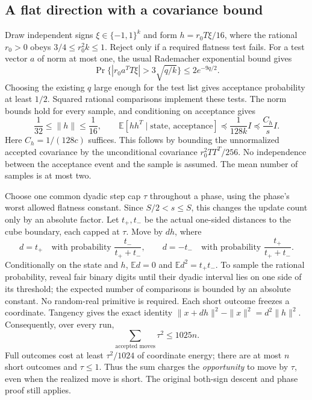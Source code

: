 \documentclass[11pt]{amsart}
\theoremstyle{remark}\newtheorem{remark}[theorem]{Remark}
\begin{document}
\subsection{A flat direction with a covariance bound}
Draw independent signs $\xi\in\{-1,1\}^k$ and form
$h=r_0T\xi/16$, where the rational $r_0>0$ obeys
$3/4\le r_0^2k\le1$. Reject only if a required flatness test fails.
For a test vector $a$ of norm at most one, the usual Rademacher
exponential bound gives
\[
 \Pr\{|r_0a^TT\xi|>3\sqrt{q/k}\}\le 2e^{-9q/2}.
\]
Choosing the existing $q$ large enough for the test list gives acceptance
probability at least $1/2$. Squared rational comparisons implement these
tests. The norm bounds hold for every sample, and conditioning on
acceptance gives
\begin{equation}\label{eq:randomcov}
 \frac1{32}\le\|h\|\le\frac1{16},\qquad
 \mathbb E[hh^T\mid\text{state, acceptance}]
 \preceq\frac{1}{128k}I\preceq\frac{C_h}{s}I.
\end{equation}
Here $C_h=1/(128c)$ suffices. This follows by bounding the unnormalized
accepted covariance by the unconditional covariance
$r_0^2TT^T/256$. No independence between the acceptance event and the
sample is assumed. The mean number of samples is at most two.

Choose one common dyadic step cap $\tau$ throughout a phase, using the
phase's worst allowed flatness constant. Since $S/2<s\le S$, this changes
the update count only by an absolute factor. Let $t_+,t_-$ be the actual
one-sided distances to the cube boundary, each capped at $\tau$. Move by
$d h$, where
\[
 d=t_+\quad\text{with probability }\frac{t_-}{t_++t_-},
 \qquad
 d=-t_-\quad\text{with probability }\frac{t_+}{t_++t_-}.
\]
Conditionally on the state and $h$, $\mathbb E d=0$ and
$\mathbb E d^2=t_+t_-$. To sample the rational probability, reveal fair
binary digits until their dyadic interval lies on one side of its
threshold; the expected number of comparisons is bounded by an absolute
constant. No random-real primitive is required.
Each short outcome freezes a coordinate. Tangency
gives the exact identity
$\|x+dh\|^2-\|x\|^2=d^2\|h\|^2$.
Consequently, over every run,
\begin{equation}\label{eq:opportunitybudget}
 \sum_{\text{accepted moves}}\tau^2\le1025n.
\end{equation}
Full outcomes cost at least $\tau^2/1024$ of coordinate energy; there are
at most $n$ short outcomes and $\tau\le1$. Thus the sum charges the
\emph{opportunity} to move by $\tau$, even when the realized move is short.
The original both-sign descent and phase proof still applies.
\end{document}
